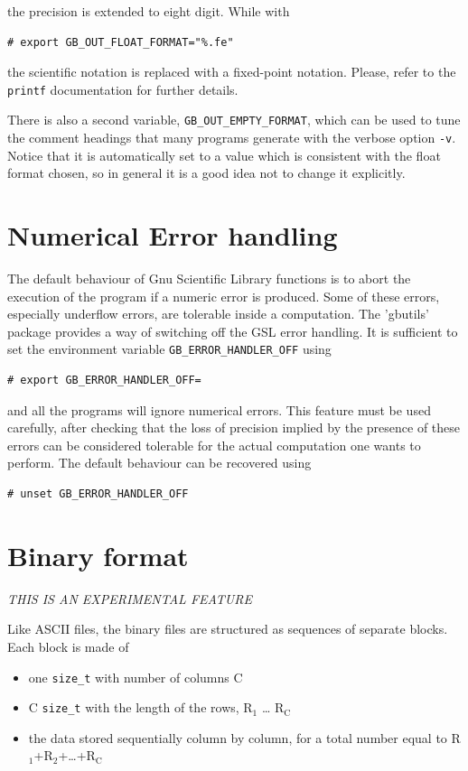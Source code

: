 \documentclass[11pt]{article}
\begin{document}
the precision is extended to eight digit. While with

\begin{verbatim}
# export GB_OUT_FLOAT_FORMAT="%.fe"
\end{verbatim}

the scientific notation is replaced with a fixed-point
notation. Please, refer to the \texttt{printf} documentation for further
details.

There is also a second variable, \texttt{GB\_OUT\_EMPTY\_FORMAT}, which can be
used to tune the comment headings that many programs generate with the
verbose option \texttt{-v}. Notice that it is automatically set to a value
which is consistent with the float format chosen, so in general it is
a good idea not to change it explicitly.
\section{Numerical Error handling}
\label{sec-3}

The default behaviour of Gnu Scientific Library functions is to abort
the execution of the program if a numeric error is produced. Some of
these errors, especially underflow errors, are tolerable inside a
computation. The 'gbutils' package provides a way of switching off the
GSL error handling. It is sufficient to set the environment variable
\texttt{GB\_ERROR\_HANDLER\_OFF} using

\begin{verbatim}
# export GB_ERROR_HANDLER_OFF=
\end{verbatim}

and all the programs will ignore numerical errors. This feature must
be used carefully, after checking that the loss of precision implied
by the presence of these errors can be considered tolerable for the
actual computation one wants to perform. The default behaviour can be
recovered using

\begin{verbatim}
# unset GB_ERROR_HANDLER_OFF
\end{verbatim}
\section{Binary format}
\label{sec-4}

\emph{THIS IS AN EXPERIMENTAL FEATURE}

Like ASCII files, the binary files are structured as sequences of
separate blocks. Each block is made of

\begin{itemize}
\item one \texttt{size\_t} with number of columns C

\item C \texttt{size\_t} with the length of the rows, R$_{\text{1}}$ \ldots{} R$_{\text{C}}$

\item the data stored sequentially column by column, for a total number
equal to R$_{\text{1}}$+R$_{\text{2}}$+\ldots{}+R$_{\text{C}}$
\end{itemize}
\end{document}
